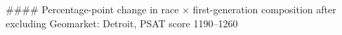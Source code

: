 #### Percentage-point change in race × first-generation composition after excluding Geomarket: Detroit, PSAT score 1190–1260

